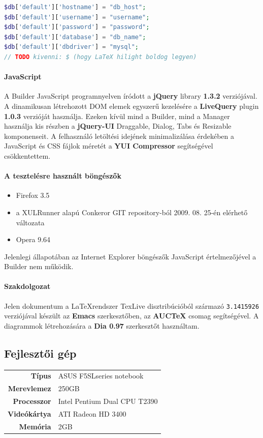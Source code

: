 \documentclass[12pt,a4paper,twoside]{article}
\begin{document}
\begin{lstlisting}[language=PHP, firstnumber=40]
$db['default']['hostname'] = "db_host";
$db['default']['username'] = "username";
$db['default']['password'] = "password";
$db['default']['database'] = "db_name";
$db['default']['dbdriver'] = "mysql";
// TODO kivenni: $ (hogy LaTeX hilight boldog legyen)
\end{lstlisting}

\paragraph{JavaScript}
A Builder JavaScript programnyelven íródott a \textbf{jQuery}\cite{JQ} library
\textbf{1.3.2} verziójával. A dinamikusan létrehozott DOM elemek egyszerű
kezelésére a \textbf{LiveQuery}\cite{JQ-LiveQuery} plugin \textbf{1.0.3}
verzióját használja. Ezeken kívül mind a Builder, mind a Manager használja
kis részben a \textbf{jQuery-UI}\cite{JQ-UI} Draggable, Dialog, Tabs és
Resizable komponenseit. A felhasználó letöltési idejének minimalizálása
érdekében a JavaScript és CSS fájlok méretét a \textbf{YUI Compressor}\cite{YUI}
segítségével csökkentettem.

\paragraph{A tesztelésre használt böngészők}
\begin{itemize}
\item Firefox 3.5
\item a XULRunner alapú Conkeror GIT repository-ból 2009. 08. 25-én elérhető változata
\item Opera 9.64
\end{itemize}
Jelenlegi állapotában az Internet Explorer böngészők JavaScript
értelmezőjével a Builder nem működik.

\paragraph{Szakdolgozat}
Jelen dokumentum a \LaTeX  rendszer TexLive disztribúcióból származó
\texttt{3.1415926} verziójával készült az \textbf{Emacs} szerkesztőben, az
\textbf{AUCTeX} csomag segítségével. A diagrammok létrehozására a \textbf{Dia 0.97}
szerkesztőt használtam.

\subsection{Fejlesztői gép}
\begin{tabular*}{\textwidth}{>{\bf}r|l}
  Típus       & ASUS F5SLseries notebook\\
  Merevlemez  & 250GB\\
  Processzor  & Intel Pentium Dual CPU T2390\\
  Videókártya & ATI Radeon HD 3400\\
  Memória     & 2GB\\
\end{tabular*}
\end{document}
